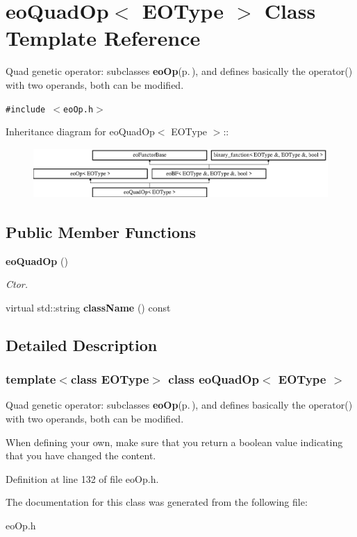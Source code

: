 \section{eo\-Quad\-Op$<$ EOType $>$ Class Template Reference}
\label{classeo_quad_op}
Quad genetic operator: subclasses {\bf eo\-Op}{\rm (p.\,\pageref{classeo_op})}, and defines basically the operator() with two operands, both can be modified.  


{\tt \#include $<$eo\-Op.h$>$}

Inheritance diagram for eo\-Quad\-Op$<$ EOType $>$::\begin{figure}[H]
\begin{center}
\leavevmode
\includegraphics[height=1.90476cm]{classeo_quad_op}
\end{center}
\end{figure}
\subsection*{Public Member Functions}
\begin{CompactItemize}
\item 
{\bf eo\-Quad\-Op} ()\label{classeo_quad_op_a0}

\begin{CompactList}\small\item\em Ctor. \item\end{CompactList}\item 
virtual std::string {\bf class\-Name} () const \label{classeo_quad_op_a1}

\end{CompactItemize}


\subsection{Detailed Description}
\subsubsection*{template$<$class EOType$>$ class eo\-Quad\-Op$<$ EOType $>$}

Quad genetic operator: subclasses {\bf eo\-Op}{\rm (p.\,\pageref{classeo_op})}, and defines basically the operator() with two operands, both can be modified. 

When defining your own, make sure that you return a boolean value indicating that you have changed the content. 



Definition at line 132 of file eo\-Op.h.

The documentation for this class was generated from the following file:\begin{CompactItemize}
\item 
eo\-Op.h\end{CompactItemize}
